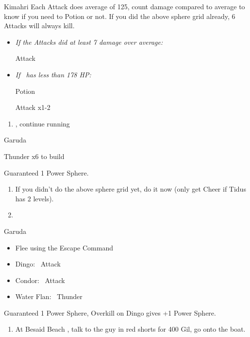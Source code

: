 \begin{battle}[750]{Kimahri}
    Each Attack does average of 125, count damage compared to average to know if you need to Potion or not.
    If you did the above sphere grid already, 6 Attacks will always kill.
    \begin{itemize}
        \tidusf Attack x5
        \item \textit{If the Attacks did at least 7 damage over average:}
        \begin{itemize}
            \tidusf Attack
        \end{itemize}
        \item \textit{If \tidus\ has less than 178 HP:}
        \begin{itemize}
            \tidusf Potion
        \end{itemize}
        \tidusf Attack x1-2
    \end{itemize}
\end{battle}
\begin{enumerate}[resume]
    \item \sd, continue running
\end{enumerate}
\begin{battle}{Garuda}
    \begin{itemize}
        \summon{\valefor}
        \valeforf Thunder x6 to build \od
    \end{itemize}
    Guaranteed 1 Power Sphere.
\end{battle}
\begin{enumerate}[resume]
    \item If you didn't do the above sphere grid yet, do it now (only get Cheer if Tidus has 2 levels).
    \item \formation{\tidus}{\yuna}{\lulu}
\end{enumerate}
\begin{battle}{Garuda}
    \begin{itemize}
        \item Flee using the Escape Command
    \end{itemize}
\end{battle}
\begin{encounters}
    \begin{itemize}
        \item Dingo: \tidus\ Attack
        \item Condor: \wakka\ Attack
        \item Water Flan: \lulu\ Thunder
    \end{itemize}
    Guaranteed 1 Power Sphere, Overkill on Dingo gives +1 Power Sphere.
\end{encounters}
\begin{enumerate}[resume]
    \item At Besaid Beach \save, talk to the guy in red shorts for 400 Gil, go onto the boat.
\end{enumerate}